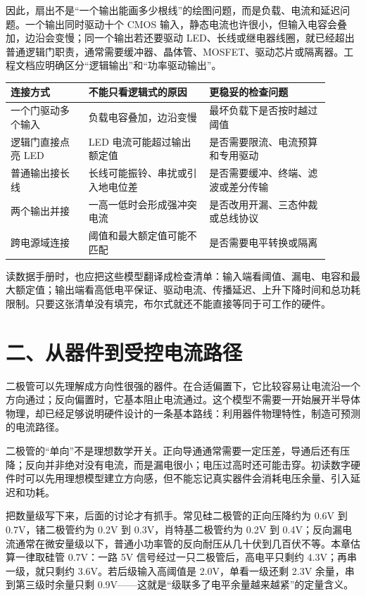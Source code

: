 因此，扇出不是“一个输出能画多少根线”的绘图问题，而是负载、电流和延迟问题。一个输出同时驱动十个 CMOS 输入，静态电流也许很小，但输入电容会叠加，边沿会变慢；同一个输出若还要驱动 LED、长线或继电器线圈，就已经超出普通逻辑门职责，通常需要缓冲器、晶体管、MOSFET、驱动芯片或隔离器。工程文档应明确区分“逻辑输出”和“功率驱动输出”。

\begin{longtable}{L{0.22\linewidth}L{0.34\linewidth}L{0.34\linewidth}}
\toprule
连接方式 & 不能只看逻辑式的原因 & 更稳妥的检查问题 \\
\midrule
一个门驱动多个输入 & 负载电容叠加，边沿变慢 & 最坏负载下是否按时越过阈值 \\\tablerowrule
逻辑门直接点亮 LED & LED 电流可能超过输出额定值 & 是否需要限流、电流预算和专用驱动 \\\tablerowrule
普通输出接长线 & 长线可能振铃、串扰或引入地电位差 & 是否需要缓冲、终端、滤波或差分传输 \\\tablerowrule
两个输出并接 & 一高一低时会形成强冲突电流 & 是否改用开漏、三态仲裁或总线协议 \\\tablerowrule
跨电源域连接 & 阈值和最大额定值可能不匹配 & 是否需要电平转换或隔离 \\
\bottomrule
\end{longtable}

读数据手册时，也应把这些模型翻译成检查清单：输入端看阈值、漏电、电容和最大额定值；输出端看高低电平保证、驱动电流、传播延迟、上升下降时间和总功耗限制。只要这张清单没有填完，布尔式就还不能直接等同于可工作的硬件。

\section{二、从器件到受控电流路径}

二极管可以先理解成方向性很强的器件。在合适偏置下，它比较容易让电流沿一个方向通过；反向偏置时，它基本阻止电流通过。这个模型不需要一开始展开半导体物理，却已经足够说明硬件设计的一条基本路线：利用器件物理特性，制造可预测的电流路径。

二极管的“单向”不是理想数学开关。正向导通通常需要一定压差，导通后还有压降；反向并非绝对没有电流，而是漏电很小；电压过高时还可能击穿。初读数字硬件时可以先用理想模型建立方向感，但不能忘记真实器件会消耗电压余量、引入延迟和功耗。

把数量级写下来，后面的讨论才有抓手。常见硅二极管的正向压降约为 0.6V 到 0.7V，锗二极管约为 0.2V 到 0.3V，肖特基二极管约为 0.2V 到 0.4V；反向漏电流通常在微安量级以下，普通小功率管的反向耐压从几十伏到几百伏不等。本章估算一律取硅管 0.7V：一路 5V 信号经过一只二极管后，高电平只剩约 4.3V；再串一级，就只剩约 3.6V。若后级输入高阈值是 2.0V，单看一级还剩 2.3V 余量，串到第三级时余量只剩 0.9V——这就是“级联多了电平余量越来越紧”的定量含义。

